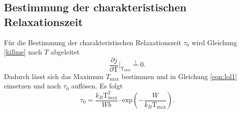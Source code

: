 \subsection{Bestimmung der charakteristischen Relaxationszeit}
Für die Bestimmung der charakteristischen Relaxationszeit $\tau_0$ wird Gleichung \eqref{killme} nach $T$ abgeleitet
\begin{equation}
\frac{\partial j}{\partial \text{T}}\biggr|_{\text{T}_{\text{max}}} \stackrel{!}{=} 0.
\end{equation}
Dadurch lässt sich das Maximum $T_{\text{max}}$ bestimmen und in Gleichung \eqref{eqn:lol1} einsetzen und nach $\tau_0$ auflösen. Es folgt
\begin{equation}
\tau_0 = \frac{k_B \text{T}^2_{\text{max}}}{Wb} \cdot \text{exp} \left( - \frac{W}{k_B \text{T}_{\text{max}}}\right).
\end{equation}







